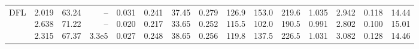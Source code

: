 \begin{landscape}
\begin{table}[t]
{\begin{tabular}{@{}lrrrrrrrrrrrrrr@{}}
DFL & \makecell[r]{2.019\\2.638\\2.315} & \makecell[r]{63.24\\71.22\\67.37} & \makecell[r]{--\\--\\3.3e5} & \makecell[r]{0.031\\0.020\\0.027} & \makecell[r]{0.241\\0.217\\0.248} & \makecell[r]{37.45\\33.65\\38.65} & \makecell[r]{0.279\\0.252\\0.256} & \makecell[r]{126.9\\115.5\\119.8} & \makecell[r]{153.0\\102.0\\137.5} & \makecell[r]{219.6\\190.5\\226.5} & \makecell[r]{1.035\\0.991\\1.031} & \makecell[r]{2.942\\2.802\\3.082} & \makecell[r]{0.118\\0.100\\0.128} & \makecell[r]{14.44\\15.01\\14.46} \\

\end{tabular}}
\end{table}
\end{landscape}
